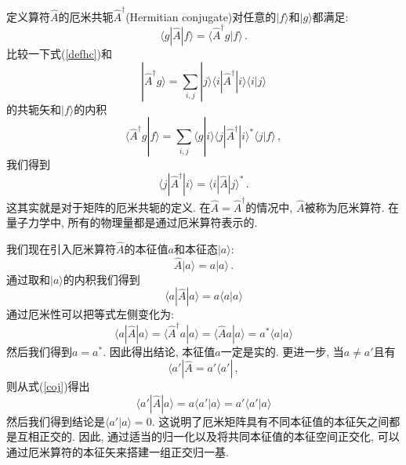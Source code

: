 \documentclass[b5paper]{book}
\begin{document}
定义算符$\hat{A}$的厄米共轭$\hat{A}^\dagger$(Hermitian conjugate)对任意的$|f\rangle$和$|g\rangle$都满足:
\begin{equation}\label{defhc}
\langle g|\hat{A}|f\rangle =\langle \hat{A}^\dagger g|f\rangle\,.
\end{equation}
比较一下式(\ref{defhc})和
\begin{equation}
|\hat{A}^\dagger g\rangle =\sum_{i,j}|j\rangle\langle i|\hat{A}^\dagger|i\rangle\langle i|j\rangle
\end{equation}
的共轭矢和$|f\rangle$的内积 
\begin{equation}
\langle \hat{A}^\dagger g|f\rangle=\sum_{i,j}\langle g|i\rangle \langle j|\hat{A}^\dagger|i\rangle^*\langle j|f\rangle\,,
\end{equation}
我们得到
\begin{equation}
\langle j|\hat{A}^\dagger|i\rangle =\langle i|\hat{A}|j\rangle^*\,.
\end{equation}
这其实就是对于矩阵的厄米共轭的定义. 在$\hat{A}=\hat{A}^\dagger$的情况中, $\hat{A}$被称为厄米算符. 在量子力学中, 所有的物理量都是通过厄米算符表示的.

我们现在引入厄米算符$\hat{A}$的本征值$a$和本征态$|a\rangle$:
\begin{equation}
\hat{A}|a\rangle= a |a\rangle\,.
\end{equation}
通过取和$|a\rangle$的内积我们得到
\begin{equation}
\langle a|\hat{A}|a\rangle = a \langle a|a\rangle
\end{equation}
通过厄米性可以把等式左侧变化为:
\begin{equation}\label{coj}
\langle a|\hat{A}|a\rangle = \langle \hat{A}^\dagger a |a\rangle =\langle \hat{A}a|a\rangle =a^*\langle a|a \rangle
\end{equation}
然后我们得到$a=a^*$. 因此得出结论, 本征值$a$一定是实的. 更进一步, 当$a\neq a'$且有
\begin{equation}
\langle a'|\hat{A}=a'\langle a'|\,,
\end{equation}
则从式(\ref{coj})得出
\begin{equation}
\langle a'|\hat{A}|a\rangle = a\langle a'|a\rangle =a'\langle a'|a \rangle
\end{equation}
然后我们得到结论是$\langle a'|a\rangle =0$. 这说明了厄米矩阵具有不同本征值的本征矢之间都是互相正交的. 因此, 通过适当的归一化以及将共同本征值的本征空间正交化, 可以通过厄米算符的本征矢来搭建一组正交归一基.
\end{document}

